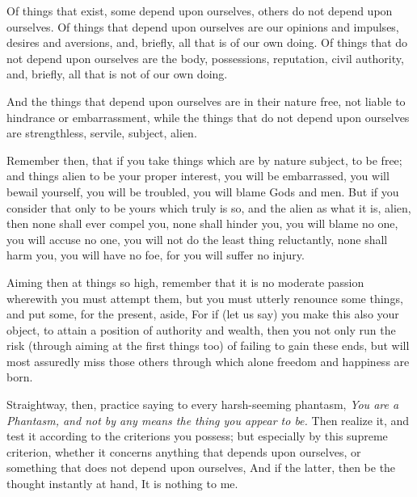 Of things  that exist, some  depend upon ourselves,  others do not  depend upon
ourselves. Of things that depend upon  ourselves are our opinions and impulses,
desires and aversions,  and, briefly, all that  is of our own  doing. Of things
that do not depend upon ourselves  are the body, possessions, reputation, civil
authority, and, briefly, all that is not of our own doing.

And the things that depend upon ourselves  are in their nature free, not liable
to  hindrance or  embarrassment,  while  the things  that  do  not depend  upon
ourselves are strengthless, servile, subject, alien.

Remember then, that if you take things which are by nature subject, to be free;
and things alien to be your proper  interest, you will be embarrassed, you will
bewail yourself, you will be troubled, you  will blame Gods and men. But if you
consider that only to be yours which truly  is so, and the alien as what it is,
alien, then none shall  ever compel you, none shall hinder  you, you will blame
no one, you  will accuse no one,  you will not do the  least thing reluctantly,
none shall harm you, you will have no foe, for you will suffer no injury.

Aiming  then  at things  so  high,  remember that  it  is  no moderate  passion
wherewith you must attempt them, but you must utterly renounce some things, and
put some, for the  present, aside, For if (let us say) you  make this also your
object, to attain a position of authority and wealth, then you not only run the
risk (through aiming  at the first things  too) of failing to  gain these ends,
but  will most  assuredly miss  those others  through which  alone freedom  and
happiness are born.

Straightway, then,  practice saying to every  harsh-seeming phantasm, \emph{You
are a Phantasm, and not by any means  the thing you appear to be.} Then realize
it, and test it according to the criterions you possess; but especially by this
supreme criterion, whether it concerns anything that depends upon ourselves, or
something that does not  depend upon ourselves, And if the  latter, then be the
thought instantly at hand, It is nothing to me.
